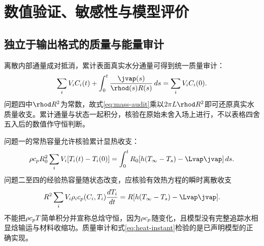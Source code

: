 \section{数值验证、敏感性与模型评价}\label{sec:validation}
\subsection{独立于输出格式的质量与能量审计}
离散内部通量成对抵消，累计表面真实水分通量可得到统一质量审计：
\begin{equation}
\sum_iV_i\C_i(\t)+\int_0^\t\frac{\jvap(s)}{\rhod(s)\R(s)}\,ds
=\sum_iV_i\C_i(0).\label{eq:mass-audit}
\end{equation}
问题四中$\rhod\R^2$为常数，故式\eqref{eq:mass-audit}乘以$2\pi\Llen\rhod\R^2$即可还原真实水质量收支。累计通量与状态一起积分，核验在原始未舍入场上进行，不以表格四舍五入后的数值作守恒判断。

问题一的常热容量允许核验累计显热收支：
\begin{equation}
\rho\cp\Rzero^2\sum_iV_i[\T_i(\t)-\T_i(0)]
=\int_0^\t\Rzero[\hconv(\Tinf-\T_s)-\Lvap\jvap]\,ds.\label{eq:heat-audit}
\end{equation}
问题二至四的经验热容量随状态改变，应核验有效热方程的瞬时离散收支
\begin{equation}
\R^2\sum_iV_i\rho_i\cp(\C_i,\T_i)\frac{d\T_i}{d\t}
=\R[\hconv(\Tinf-\T_s)-\Lvap\jvap].\label{eq:heat-instant}
\end{equation}
不能把$\rho c_pT$简单积分并宣称总焓守恒，因为$\rho c_p$随\C{}变化，且模型没有完整追踪水相显焓输运与材料收缩功。质量审计和式\eqref{eq:heat-instant}检验的是已声明模型的正确实现。

